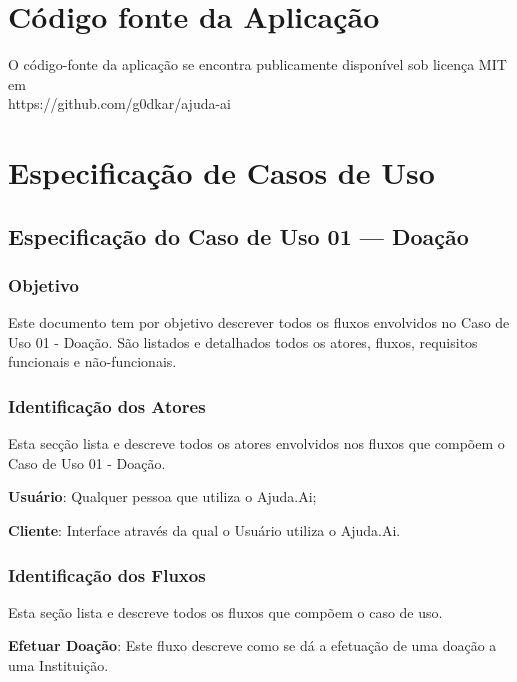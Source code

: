 \begin{anexosenv}

\chapter{Código fonte da Aplicação} \label{anexo:a}
O código-fonte da aplicação se encontra publicamente disponível sob licença MIT em \\
https://github.com/g0dkar/ajuda-ai

\chapter{Especificação de Casos de Uso} \label{anexo:b}

\section*{Especificação do Caso de Uso 01 --- Doação}
\subsection*{Objetivo}
Este documento tem por objetivo descrever todos os fluxos envolvidos no Caso de Uso 01 - Doação. São listados e detalhados todos os atores, fluxos, requisitos funcionais e não-funcionais.

\subsection*{Identificação dos Atores}
Esta secção lista e descreve todos os atores envolvidos nos fluxos que compõem o Caso de Uso 01 - Doação.
\begin{lista}
  \item \textbf{Usuário}: Qualquer pessoa que utiliza o Ajuda.Ai;
  \item \textbf{Cliente}: Interface através da qual o Usuário utiliza o Ajuda.Ai.
\end{lista}

\subsection*{Identificação dos Fluxos}
Esta seção lista e descreve todos os fluxos que compõem o caso de uso.
\begin{lista}
  \item \textbf{Efetuar Doação}: Este fluxo descreve como se dá a efetuação de uma doação a uma Instituição.
\end{lista}


\end{anexosenv}
